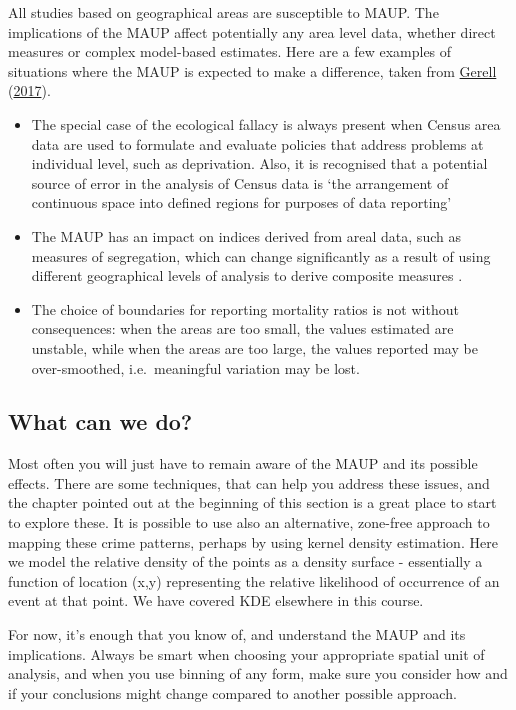\documentclass[
  krantz2]{krantz}
\providecommand{\tightlist}{%
  \setlength{\itemsep}{0pt}\setlength{\parskip}{0pt}}
\begin{document}
All studies based on geographical areas are susceptible to MAUP. The implications of the MAUP affect potentially any area level data, whether direct measures or complex model-based estimates. Here are a few examples of situations where the MAUP is expected to make a difference, taken from \protect\hyperlink{ref-Gerell_2017}{Gerell} (\protect\hyperlink{ref-Gerell_2017}{2017}).

\begin{itemize}
\tightlist
\item
  The special case of the ecological fallacy is always present when Census area data are used to formulate and evaluate policies that address problems at individual level, such as deprivation. Also, it is recognised that a potential source of error in the analysis of Census data is `the arrangement of continuous space into defined regions for purposes of data reporting'
\item
  The MAUP has an impact on indices derived from areal data, such as measures of segregation, which can change significantly as a result of using different geographical levels of analysis to derive composite measures .
\item
  The choice of boundaries for reporting mortality ratios is not without consequences: when the areas are too small, the values estimated are unstable, while when the areas are too large, the values reported may be over-smoothed, i.e.~meaningful variation may be lost.
\end{itemize}

\hypertarget{what-can-we-do}{%
\subsection{What can we do?}\label{what-can-we-do}}

Most often you will just have to remain aware of the MAUP and its possible effects. There are some techniques, that can help you address these issues, and the chapter pointed out at the beginning of this section is a great place to start to explore these. It is possible to use also an alternative, zone-free approach to mapping these crime patterns, perhaps by using kernel density estimation. Here we model the relative density of the points as a density surface - essentially a function of location (x,y) representing the relative likelihood of occurrence of an event at that point. We have covered KDE elsewhere in this course.

For now, it's enough that you know of, and understand the MAUP and its implications. Always be smart when choosing your appropriate spatial unit of analysis, and when you use binning of any form, make sure you consider how and if your conclusions might change compared to another possible approach.
\end{document}
